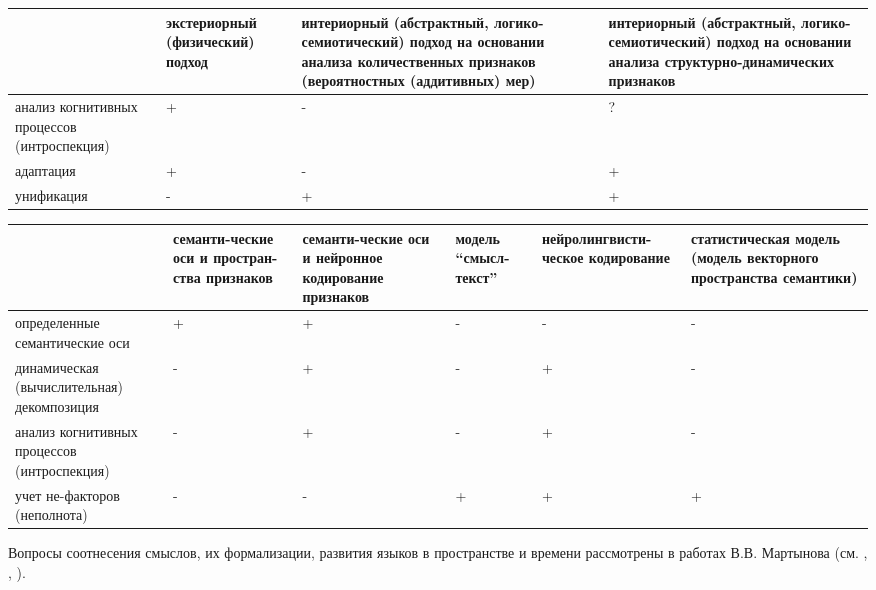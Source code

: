 \begin{SCn}
\end{SCn}

\begin{tabular}{|>{\centering\arraybackslash}m{3cm}|>{\centering\arraybackslash}m{3cm}|>{\centering\arraybackslash}m{5cm}|>{\centering\arraybackslash}m{5.25cm}|}
	\hline
	& экстериорный (физический) подход
	& интериорный (абстрактный, логико-семиотический) подход на основании анализа количественных признаков (вероятностных (аддитивных) мер)
	& интериорный (абстрактный, логико-семиотический) подход на основании анализа структурно-динамических признаков
	\\
	\hline
	анализ когнитивных процессов (интроспекция)
	& +
	& -
	& ?
	\\
	\hline
	адаптация
	& +
	& -
	& +
	\\
	\hline
	унификация
	& -
	& +
	& +
	\\
	\hline
\end{tabular}

\begin{tabular}{|>{\centering\arraybackslash}m{3cm}|>{\centering\arraybackslash}m{2cm}|>{\centering\arraybackslash}m{2cm}|>{\centering\arraybackslash}m{3cm}|>{\centering\arraybackslash}m{3cm}|>{\centering\arraybackslash}m{3cm}|}
	\hline
	& семанти-ческие оси и простран-ства признаков
	& семанти-ческие оси и нейронное кодирование признаков
	& модель ``смысл-текст''
	& нейролингвисти-ческое кодирование
	& статистическая модель (модель векторного пространства семантики)
	\\
	\hline
	определенные семантические оси
	& +
	& +
	& -
	& -
	& -
	\\
	\hline
	динамическая (вычислительная) декомпозиция
	& -
	& +
	& -
	& +
	& -
	\\
	\hline
	анализ когнитивных процессов (интроспекция)
	& -
	& +
	& -
	& +
	& -
	\\
	\hline
	учет не-факторов (неполнота)
	& -
	& -
	& +
	& +
	& +
	\\
	\hline
\end{tabular}


Вопросы соотнесения смыслов, их формализации, развития языков в пространстве и времени рассмотрены в работах В.В. Мартынова (см. , , ).

